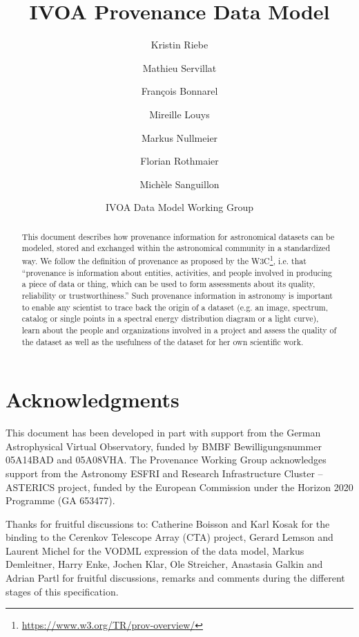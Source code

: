 \documentclass[11pt,a4paper]{ivoa}
\author{Kristin Riebe}
\author{Mathieu Servillat}
\author{François Bonnarel}
\author{Mireille Louys}
\author{Markus Nullmeier}
\author{Florian Rothmaier}
\author{Michèle Sanguillon}
\author{IVOA Data Model Working Group}
\begin{document}

\lstset{escapechar=@,style=customc}


\title{IVOA Provenance Data Model}

\begin{abstract}
This document describes how provenance information for astronomical datasets 
can be modeled, stored and exchanged within 
the astronomical community in a standardized way.
We follow the definition of provenance as proposed by the W3C\footnote{\url{https://www.w3.org/TR/prov-overview/}}, i.e. that ``provenance is information about entities, activities, and people involved in producing a piece of data or thing, which can be used to form assessments about its quality, reliability or trustworthiness.''
Such provenance information in astronomy is important to enable any scientist to trace back
the origin of a dataset (e.g. an image, spectrum, catalog or single points in a 
spectral energy distribution diagram or a light curve), learn about the people and 
organizations involved in a project and assess the quality of the dataset as well
as the usefulness of the dataset for her own scientific work.
\end{abstract}


\section*{Acknowledgments}

This document has been developed in part with support from the German
Astrophysical Virtual Observatory, funded by BMBF Bewilligungsnummer 05A14BAD and 05A08VHA.
The Provenance Working Group acknowledges support from the Astronomy ESFRI and Research Infrastructure Cluster – ASTERICS project, funded by the European Commission under the Horizon 2020 Programme (GA 653477).

Thanks for fruitful discussions to: Catherine Boisson and Karl Kosak for the
binding to the Cerenkov Telescope Array (CTA) project, Gerard
Lemson and Laurent Michel for the VODML expression of the data model, Markus Demleitner,
Harry Enke, Jochen Klar, Ole Streicher, Anastasia Galkin and Adrian Partl
for fruitful discussions, remarks and comments during the different stages of this
specification.
\end{document}
